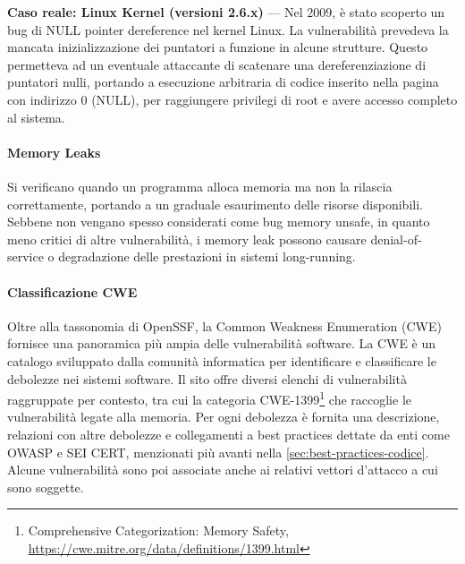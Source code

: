 \textbf{Caso reale: Linux Kernel (versioni 2.6.x)} — Nel 2009, è stato scoperto un
bug di NULL pointer dereference nel kernel Linux. La vulnerabilità prevedeva la
mancata inizializzazione dei puntatori a funzione in alcune strutture. Questo permetteva
ad un eventuale attaccante di scatenare una dereferenziazione di puntatori nulli,
portando a esecuzione arbitraria di codice inserito nella pagina con indirizzo 0
(NULL), per raggiungere privilegi di root e avere accesso completo al sistema.\cite{null_pointer_dereference_linux}

\paragraph{Memory Leaks}
\label{sec:memory_leaks} Si verificano quando un programma alloca memoria ma non
la rilascia correttamente, portando a un graduale esaurimento delle risorse
disponibili. Sebbene non vengano spesso considerati come bug memory unsafe, in
quanto meno critici di altre vulnerabilità, i memory leak possono causare denial-of-service
o degradazione delle prestazioni in sistemi long-running.

\paragraph{Classificazione CWE}
Oltre alla tassonomia di OpenSSF, la Common Weakness Enumeration (CWE) fornisce una
panoramica più ampia delle vulnerabilità software. La CWE è un catalogo
sviluppato dalla comunità informatica per identificare e classificare le
debolezze nei sistemi software. Il sito offre diversi elenchi di vulnerabilità raggruppate
per contesto, tra cui la categoria CWE-1399\footnote{Comprehensive
Categorization: Memory Safety,
\url{https://cwe.mitre.org/data/definitions/1399.html}} che raccoglie le vulnerabilità
legate alla memoria. Per ogni debolezza è fornita una descrizione, relazioni con
altre debolezze e collegamenti a best practices dettate da enti come OWASP e SEI
CERT, menzionati più avanti nella \autoref{sec:best-practices-codice}. Alcune vulnerabilità
sono poi associate anche ai relativi vettori d'attacco a cui sono soggette.